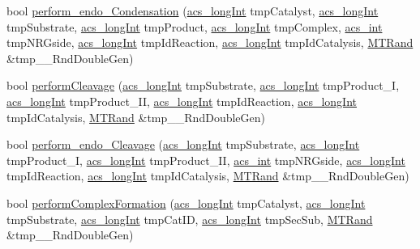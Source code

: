 \begin{DoxyCompactItemize}
\item 
bool \hyperlink{a00014_aa7a2cc95d8ba242c805a8fda063b23a7}{perform\-\_\-endo\-\_\-\-Condensation} (\hyperlink{a00050_a19319d75f02db4308bc5c0026d98cd85}{acs\-\_\-long\-Int} tmp\-Catalyst, \hyperlink{a00050_a19319d75f02db4308bc5c0026d98cd85}{acs\-\_\-long\-Int} tmp\-Substrate, \hyperlink{a00050_a19319d75f02db4308bc5c0026d98cd85}{acs\-\_\-long\-Int} tmp\-Product, \hyperlink{a00050_a19319d75f02db4308bc5c0026d98cd85}{acs\-\_\-long\-Int} tmp\-Complex, \hyperlink{a00050_a8d277355641a098190360234e2ebde35}{acs\-\_\-int} tmp\-N\-R\-Gside, \hyperlink{a00050_a19319d75f02db4308bc5c0026d98cd85}{acs\-\_\-long\-Int} tmp\-Id\-Reaction, \hyperlink{a00050_a19319d75f02db4308bc5c0026d98cd85}{acs\-\_\-long\-Int} tmp\-Id\-Catalysis, \hyperlink{a00016}{M\-T\-Rand} \&tmp\-\_\-\-\_\-\-Rnd\-Double\-Gen)
\item 
bool \hyperlink{a00014_aa4ed307a123c402166cfc7f6ed99043a}{perform\-Cleavage} (\hyperlink{a00050_a19319d75f02db4308bc5c0026d98cd85}{acs\-\_\-long\-Int} tmp\-Substrate, \hyperlink{a00050_a19319d75f02db4308bc5c0026d98cd85}{acs\-\_\-long\-Int} tmp\-Product\-\_\-\-I, \hyperlink{a00050_a19319d75f02db4308bc5c0026d98cd85}{acs\-\_\-long\-Int} tmp\-Product\-\_\-\-I\-I, \hyperlink{a00050_a19319d75f02db4308bc5c0026d98cd85}{acs\-\_\-long\-Int} tmp\-Id\-Reaction, \hyperlink{a00050_a19319d75f02db4308bc5c0026d98cd85}{acs\-\_\-long\-Int} tmp\-Id\-Catalysis, \hyperlink{a00016}{M\-T\-Rand} \&tmp\-\_\-\-\_\-\-Rnd\-Double\-Gen)
\item 
bool \hyperlink{a00014_ade26b82a3b48a5bda7e5751cbfd31b04}{perform\-\_\-endo\-\_\-\-Cleavage} (\hyperlink{a00050_a19319d75f02db4308bc5c0026d98cd85}{acs\-\_\-long\-Int} tmp\-Substrate, \hyperlink{a00050_a19319d75f02db4308bc5c0026d98cd85}{acs\-\_\-long\-Int} tmp\-Product\-\_\-\-I, \hyperlink{a00050_a19319d75f02db4308bc5c0026d98cd85}{acs\-\_\-long\-Int} tmp\-Product\-\_\-\-I\-I, \hyperlink{a00050_a8d277355641a098190360234e2ebde35}{acs\-\_\-int} tmp\-N\-R\-Gside, \hyperlink{a00050_a19319d75f02db4308bc5c0026d98cd85}{acs\-\_\-long\-Int} tmp\-Id\-Reaction, \hyperlink{a00050_a19319d75f02db4308bc5c0026d98cd85}{acs\-\_\-long\-Int} tmp\-Id\-Catalysis, \hyperlink{a00016}{M\-T\-Rand} \&tmp\-\_\-\-\_\-\-Rnd\-Double\-Gen)
\item 
bool \hyperlink{a00014_aaf4f4f6be28edb182d2a2516c9394f9b}{perform\-Complex\-Formation} (\hyperlink{a00050_a19319d75f02db4308bc5c0026d98cd85}{acs\-\_\-long\-Int} tmp\-Catalyst, \hyperlink{a00050_a19319d75f02db4308bc5c0026d98cd85}{acs\-\_\-long\-Int} tmp\-Substrate, \hyperlink{a00050_a19319d75f02db4308bc5c0026d98cd85}{acs\-\_\-long\-Int} tmp\-Cat\-I\-D, \hyperlink{a00050_a19319d75f02db4308bc5c0026d98cd85}{acs\-\_\-long\-Int} tmp\-Sec\-Sub, \hyperlink{a00016}{M\-T\-Rand} \&tmp\-\_\-\-\_\-\-Rnd\-Double\-Gen)

\end{DoxyCompactItemize}
